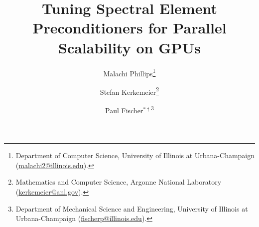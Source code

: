 \usepackage{amssymb}
\usepackage{graphicx}
\usepackage{url}
\usepackage{subcaption}
\usepackage{hyperref}
\usepackage{listings}
\usepackage{float}
\usepackage{wrapfig}
\usepackage{import}
\usepackage{booktabs}
\usepackage{siunitx}
\usepackage{algorithm}
\usepackage{algorithmic}
\usepackage{amsmath}
\usepackage{multirow}

\newcommand{\email}[1]{\protect\href{mailto:#1}{#1}}

\title{\Large Tuning Spectral Element Preconditioners for Parallel Scalability on GPUs}

\author{Malachi Phillips\thanks{Department of Computer Science, University of Illinois at Urbana-Champaign
  (\email{malachi2@illinois.edu}).
  }
\and Stefan Kerkemeier\thanks{Mathematics and Computer Science, Argonne National Laboratory
  (\email{kerkemeier@anl.gov}).
  }
\and Paul Fischer$^{*\dagger}$\thanks{Department of Mechanical Science and Engineering,
University of Illinois at Urbana-Champaign
(\email{fischerp@illinois.edu}).
  }
}
